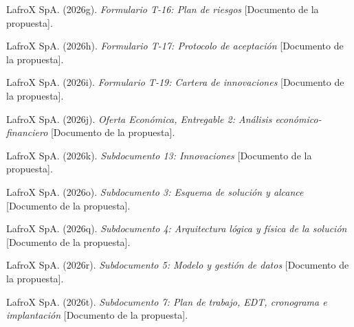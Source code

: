 \begin{list}{}{\setlength{\leftmargin}{1.27cm}\setlength{\itemindent}{-1.27cm}\setlength{\itemsep}{0.4em}\setlength{\parsep}{0pt}}
  \item \begin{samepage}LafroX SpA. (2026g). \emph{Formulario T-16: Plan de riesgos} [Documento de la propuesta].\par\end{samepage}
  \item \begin{samepage}LafroX SpA. (2026h). \emph{Formulario T-17: Protocolo de aceptación} [Documento de la propuesta].\par\end{samepage}
  \item \begin{samepage}LafroX SpA. (2026i). \emph{Formulario T-19: Cartera de innovaciones} [Documento de la propuesta].\par\end{samepage}
  \item \begin{samepage}LafroX SpA. (2026j). \emph{Oferta Económica, Entregable 2: Análisis económico-financiero} [Documento de la propuesta].\par\end{samepage}
  \item \begin{samepage}LafroX SpA. (2026k). \emph{Subdocumento 13: Innovaciones} [Documento de la propuesta].\par\end{samepage}
  \item \begin{samepage}LafroX SpA. (2026o). \emph{Subdocumento 3: Esquema de solución y alcance} [Documento de la propuesta].\par\end{samepage}
  \item \begin{samepage}LafroX SpA. (2026q). \emph{Subdocumento 4: Arquitectura lógica y física de la solución} [Documento de la propuesta].\par\end{samepage}
  \item \begin{samepage}LafroX SpA. (2026r). \emph{Subdocumento 5: Modelo y gestión de datos} [Documento de la propuesta].\par\end{samepage}
  \item \begin{samepage}LafroX SpA. (2026t). \emph{Subdocumento 7: Plan de trabajo, EDT, cronograma e implantación} [Documento de la propuesta].\par\end{samepage}

\end{list}

